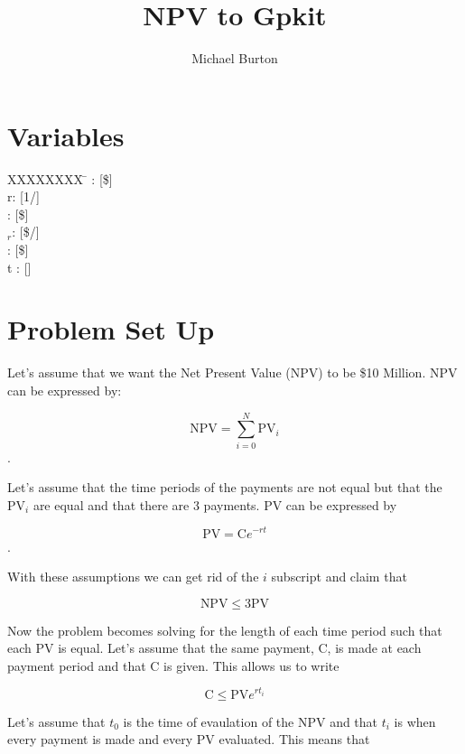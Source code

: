 \documentclass[10pt, a4paper]{article}
\begin{document}
\title{NPV to Gpkit}
\author{Michael Burton}
\maketitle

\section*{Variables}

\begin{tabbing}
  XXXXXXXX \= \kill%
 : [\$]  \\
r: [1/]   \\
: [\$]  \\
$_r$: [\$/]  \\
: [\$]  \\
t : [] 
\end{tabbing}

\section*{Problem Set Up}

Let's assume that we want the Net Present Value (NPV) to be \$10 Million.  NPV can be expressed by:

\[ \text{NPV} = \displaystyle\sum\limits_{i=0}^N \text{PV}_i \] .

Let's assume that the time periods of the payments are not equal but that the PV$_{i}$ are equal and that there are 3 payments.  PV can be expressed by

\[\text{PV} = \text{C} e^{-rt} \].

With these assumptions we can get rid of the $i$ subscript and claim that

\[\text{NPV} \leq 3\text{PV} \]

Now the problem becomes solving for the length of each time period such that each PV is equal.  Let's assume that the same payment, C, is made at each payment period and that C is given.  This allows us to write 

\[ \text{C} \leq \text{PV}e^{r t_i} \]

Let's assume that $t_0$ is the time of evaulation of the NPV and that $t_i$ is when every payment is made and every PV evaluated. This means that
\end{document}
